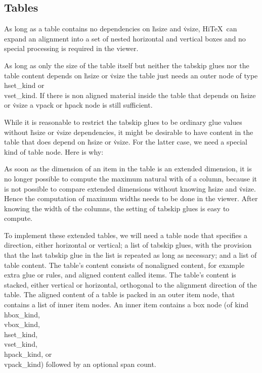 
\subsection{Tables}
As long as a table contains no dependencies on \.{hsize} and \.{vsize},
Hi\TeX\ can expand an alignment into a set of nested horizontal and
vertical boxes and no special processing is required in the viewer.

As long as only the size of the table itself but neither the tabskip
glues nor the table content depends on \.{hsize} or \.{vsize} the table
just needs an outer node of type \\{hset\_kind} or \\{vset\_kind}. If there
is non aligned material inside the table that depends on \.{hsize} or
\.{vsize} a vpack or hpack node is still sufficient.

While it is reasonable to restrict the tabskip glues to be ordinary
glue values without \.{hsize} or \.{vsize} dependencies, it might be
desirable to have content in the table that does depend on \.{hsize} or
\.{vsize}. For the latter case, we need a special kind of table
node. Here is why:

As soon as the dimension of an item in the table is an extended
dimension, it is no longer possible to compute the maximum natural with
of a column, because it is not possible to compare extended dimensions
without knowing \.{hsize} and \.{vsize}.  Hence the computation of maximum
widths needs to be done in the viewer.  After knowing the width of the columns,
the setting of tabskip glues is easy to compute.

To implement these extended tables, we will need a table node that
specifies a direction, either horizontal or vertical; a list of
tabskip glues, with the provision that the last tabskip glue in the
list is repeated as long as necessary; and a list of table content.
The table's content consists of nonaligned content, for example extra glue
or rules, and aligned content called items.
The table's content is stacked, either vertical or
horizontal, orthogonal to the alignment direction of the table.
The aligned content of a table is packed in an outer item node,
that contains a list of inner item nodes.
An inner item contains a box node (of kind \\{hbox\_kind}, \\{vbox\_kind},
\\{hset\_kind}, \\{vset\_kind}, \\{hpack\_kind}, or \\{vpack\_kind}) followed by
an optional span count.

